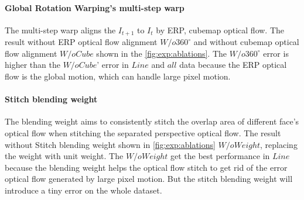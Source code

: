 \paragraph{Global Rotation Warping's multi-step warp}
The multi-step warp aligns the $I_{t+1}$ to $I_t$ by ERP, cubemap optical flow. The result without ERP optical flow alignment $W/o360^\circ$ and without cubemap optical flow alignment $W/oCube$ shown in the \cref{fig:exp:ablations}.
The $W/o360^\circ$ error is higher than the $W/oCube$' error in $Line$ and $all$ data because the ERP optical flow is the global motion, which can handle large pixel motion.

\paragraph{Stitch blending weight}
The blending weight aims to consistently stitch the overlap area of different face's optical flow when stitching the separated perspective optical flow.
The result without Stitch blending weight shown in \cref{fig:exp:ablations} $W/oWeight$, replacing the weight with unit weight.
The $W/oWeight$ get the best performance in $Line$ because the blending weight helps the optical flow stitch to get rid of the error optical flow generated by large pixel motion.
But the stitch blending weight will introduce a tiny error on the whole dataset.

